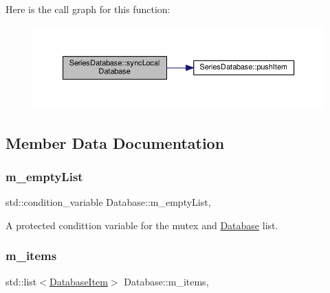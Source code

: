 Here is the call graph for this function\+:\nopagebreak
\begin{figure}[H]
\begin{center}
\leavevmode
\includegraphics[width=350pt]{classSeriesDatabase_a0ba159b6d52a3cfa07135c7d8b37ef76_cgraph}
\end{center}
\end{figure}


\subsection{Member Data Documentation}
\mbox{\label{classDatabase_a2ad8bf38964b3e18a0e168437acbdb27}} 
\subsubsection{\texorpdfstring{m\+\_\+empty\+List}{m\_emptyList}}
{\footnotesize\ttfamily std\+::condition\+\_\+variable Database\+::m\+\_\+empty\+List\hspace{0.3cm}{\ttfamily [protected]}, {\ttfamily [inherited]}}



A protected condittion variable for the mutex and \hyperlink{classDatabase}{Database} list. 

\mbox{\label{classDatabase_a5a4ac1f3bf0f5fd77a696174ad9e5c45}} 
\subsubsection{\texorpdfstring{m\+\_\+items}{m\_items}}
{\footnotesize\ttfamily std\+::list$<$\hyperlink{classDatabaseItem}{Database\+Item}$>$ Database\+::m\+\_\+items\hspace{0.3cm}{\ttfamily [protected]}, {\ttfamily [inherited]}}



